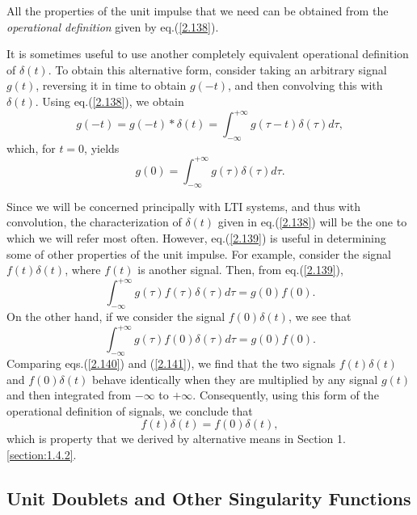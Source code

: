 \documentclass[a4paper,10pt,twoside]{book}
\begin{document}
All the properties of the unit impulse that we need can be obtained from the \textit{operational definition} given by eq.\;(\ref{2.138}).

It is sometimes useful to use another completely equivalent operational definition of $\delta(t)$. To obtain this alternative form, consider taking an arbitrary signal $g(t)$, reversing it in time to obtain $g(-t)$, and then convolving this with $\delta(t)$. Using eq.\;(\ref{2.138}), we obtain $$g(-t)= g(-t)*\delta(t)=\int_{-\infty}^{+\infty}g(\tau-t) \delta(\tau) d\tau,$$ which, for $t=0$, yields
\begin{equation}
    g(0)=\int_{-\infty}^{+\infty}g(\tau)\delta(\tau)d\tau.
    \label{2.139}
\end{equation}

Since we will be concerned principally with LTI systems, and thus with convolution, the characterization of $\delta(t)$ given in eq.\;(\ref{2.138}) will be the one to which we will refer most often. However, eq.\;(\ref{2.139}) is useful in determining some of other properties of the unit impulse. For example, consider the signal $f(t)\delta(t)$, where $f(t)$ is another signal. Then, from eq.\;(\ref{2.139}),
\begin{equation}
    \int_{-\infty}^{+\infty}g(\tau)f(\tau)\delta(\tau)d\tau=g(0)f(0).
    \label{2.140}
\end{equation}
On the other hand, if we consider the signal $f(0)\delta(t)$, we see that
\begin{equation}
    \int_{-\infty}^{+\infty}g(\tau)f(0) \delta(\tau) d\tau= g(0)f(0).
    \label{2.141}
\end{equation}
Comparing eqs.\;(\ref{2.140}) and (\ref{2.141}), we find that the two signals $f(t)\delta(t)$ and $f(0)\delta(t)$ behave identically when they are multiplied by any signal $g(t)$ and then integrated from $-\infty$ to $+\infty$. Consequently, using this form of the operational definition of signals, we conclude that
\begin{equation}
    f(t)\delta(t)=f(0)\delta(t),
    \label{2.142}
\end{equation}
which is property that we derived by alternative means in Section 1.\ref{section:1.4.2}.

\subsection{Unit Doublets and Other Singularity Functions}
\end{document}
